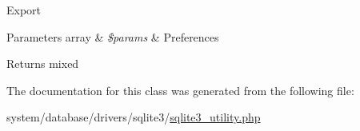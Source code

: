 Export


\begin{DoxyParams}[1]{Parameters}
array & {\em \$params} & Preferences \\
\hline
\end{DoxyParams}
\begin{DoxyReturn}{Returns}
mixed 
\end{DoxyReturn}


The documentation for this class was generated from the following file\+:\begin{DoxyCompactItemize}
\item 
system/database/drivers/sqlite3/\mbox{\hyperlink{sqlite3__utility_8php}{sqlite3\+\_\+utility.\+php}}\end{DoxyCompactItemize}
